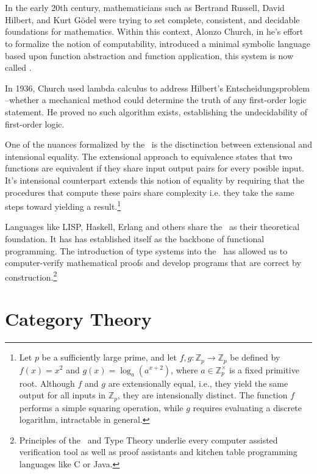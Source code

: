 \documentclass[12pt]{book}
\begin{document}
\chapter{\lCalc}



In the early 20th century, mathematicians such as Bertrand Russell, David Hilbert, and Kurt Gödel were trying to set complete, consistent, and decidable foundations for mathematics. Within this context, Alonzo Church, in he's effort to formalize the notion of  computability, introduced a minimal symbolic language based upon function abstraction and function application, this system is now called \lcalc.

In 1936, Church used lambda calculus to address Hilbert’s Entscheidungsproblem --whether a mechanical method could determine the truth of any first-order logic statement. He proved no such algorithm exists, establishing the undecidability of first-order logic.

One of the nuances formalized by the \lcalc \ is the disctinction between extensional and intensional equality. The extensional approach to equivalence states that two functions are equivalent if they share input output pairs for every posible input. It's intensional counterpart extends this notion of equality by requiring that the procedures that compute these pairs share complexity i.e. they take the same steps toward yielding a result.\footnote{
  Let \( p \) be a sufficiently large prime, and let \( f, g : \mathbb{Z}_p \to \mathbb{Z}_p \) be defined by \( f(x) = x^2 \) and \( g(x) = \log_a(a^{x+2}) \), where \( a \in \mathbb{Z}_p^\times \) is a fixed primitive root. Although \( f \) and \( g \) are extensionally equal, i.e., they yield the same output for all inputs in \( \mathbb{Z}_p \), they are intensionally distinct. The function \( f \) performs a simple squaring operation, while \( g \) requires evaluating a discrete logarithm, intractable in general. 
}

Languages like LISP, Haskell, Erlang and others share the \lcalc \ as their theoretical foundation. It has has established itself as the backbone of functional programming. The introduction of type systems into the \lcalc \ has allowed us to computer-verify mathematical proofs and develop programs that are correct by construction.\footnote{Principles of the \lcalc \ and Type Theory underlie every computer assisted verification tool as well as proof assistants and kitchen table programming languages like C or Java.}


\newpage


\newpage


\newpage


\newpage


\chapter{Category Theory}


\end{document}
